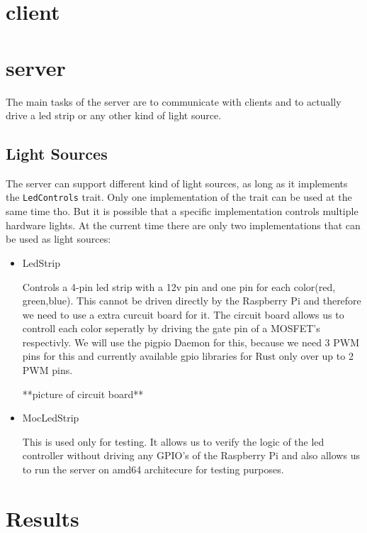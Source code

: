 \documentclass[conference]{IEEEtran}
\begin{document}
\section{client}


\section{server}
The main tasks of the server are to communicate with clients and to actually drive a 
led strip or any other kind of light source.

\subsection{Light Sources}

The server can support different kind of light sources, as long as it implements the \texttt{LedControls} trait.
Only one implementation of the trait can be used at the same time tho. But it is possible that a specific implementation
controls multiple hardware lights. At the current time there are only two implementations that can be used as light
sources:

\begin{itemize}
    \item LedStrip
    
    Controls a 4-pin led strip with a 12v pin and one pin for each color(red, green,blue). This cannot be driven 
    directly by the Raspberry Pi and therefore we need to use a extra curcuit board\cite{b0} for it. The circuit
    board allows us to controll each color seperatly by driving the gate pin of a MOSFET's respectivly. We will use 
    the pigpio Daemon\cite{b1} for this, because we need 3 PWM pins for this and currently available gpio libraries 
    for Rust only over up to 2 PWM pins.
    
    **picture of circuit board**

    \item MocLedStrip
    
    This is used only for testing. It allows us to verify the logic of the led controller without driving any
    GPIO's of the Raspberry Pi and also allows us to run the server on amd64 architecure for testing purposes.
\end{itemize}



\section{Results}
\end{document}
